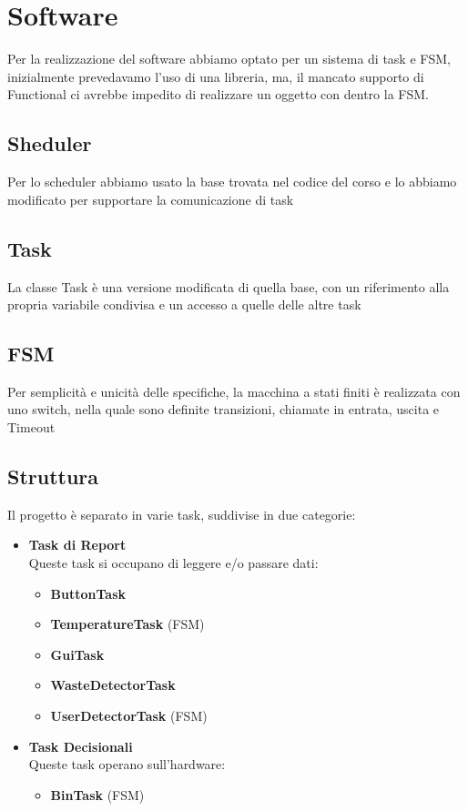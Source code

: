\documentclass[a4paper,12pt]{report}
\begin{document}
\chapter{Software}
Per la realizzazione del software abbiamo optato per un sistema di task e FSM,
inizialmente prevedavamo l'uso di una libreria, ma, il mancato supporto di Functional
ci avrebbe impedito di realizzare un oggetto con dentro la FSM.
\section{Sheduler}
Per lo scheduler abbiamo usato la base trovata nel codice del corso e lo abbiamo 
modificato per supportare la comunicazione di task
\section{Task}
La classe Task è una versione modificata di quella base, con un riferimento alla propria 
variabile condivisa e un accesso a quelle delle altre task
\section{FSM}
Per semplicità e unicità delle specifiche, la macchina a stati finiti
è realizzata con uno switch, nella quale sono definite transizioni, chiamate in entrata, uscita
e Timeout
\newpage
\section{Struttura}
Il progetto è separato in varie task, suddivise in due categorie:
\begin{itemize}
    \item \textbf{Task di Report} \\
    Queste task si occupano di leggere e/o passare dati:
    \begin{itemize}
        \item \textbf{ButtonTask}
        \item \textbf{TemperatureTask} (FSM)
        \item \textbf{GuiTask}
        \item \textbf{WasteDetectorTask}
        \item \textbf{UserDetectorTask} (FSM)
    \end{itemize}
    
    \item \textbf{Task Decisionali} \\
    Queste task operano sull'hardware:
    \begin{itemize}
        \item \textbf{BinTask} (FSM)
    \end{itemize}
\end{itemize}
\end{document}
